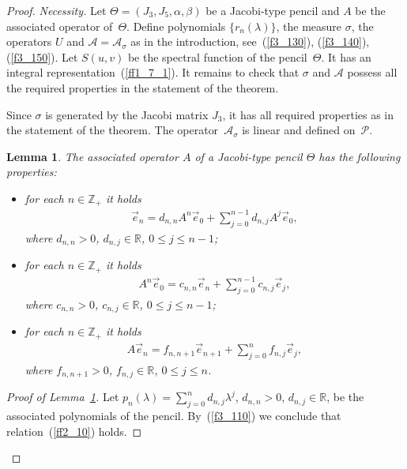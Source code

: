 \documentclass[pdftex]{sigma}
\numberwithin{equation}{section}
\newtheorem{Lemma}[Theorem]{Lemma}
 { \theoremstyle{definition}
\newtheorem{Definition}[Theorem]{Definition}
\newtheorem{Example}[Theorem]{Example} }
\begin{document}
\begin{proof} \textit{Necessity.} Let $\Theta = ( J_3, J_5, \alpha, \beta )$ be a Jacobi-type pencil and $A$ be the associated operator of~$\Theta$. Def\/ine polynomials $\{ r_n(\lambda) \}$, the measure $\sigma$, the operators $U$ and $\mathcal{A}=\mathcal{A}_\sigma$ as in the introduction, see~(\ref{f3_130}), (\ref{f3_140}), (\ref{f3_150}). Let $S(u,v)$ be the spectral function of the pencil~$\Theta$. It has an integral representation~(\ref{ff1_7_1}). It remains to check that $\sigma$ and $\mathcal{A}$ possess all the required properties in the statement of the theorem.

Since $\sigma$ is generated by the Jacobi matrix $J_3$, it has all required properties as in the statement of the theorem. The operator~$\mathcal{A}_\sigma$ is linear and def\/ined on~$\mathcal{P}$.

\begin{Lemma}\label{ll2_1} The associated operator $A$ of a Jacobi-type pencil $\Theta$ has the following properties:
\begin{itemize}\itemsep=0pt
\item[$1)$] for each $n\in\mathbb{Z}_+$ it holds
\begin{gather} \label{ff2_10}
\vec e_n = d_{n,n} A^n \vec e_0 + \sum_{j=0}^{n-1} d_{n,j} A^j \vec e_0,
\end{gather}
where $d_{n,n} > 0$, $d_{n,j}\in\mathbb{R}$, $0\leq j\leq n-1$;

\item[$2)$] for each $n\in\mathbb{Z}_+$ it holds
\begin{gather}\label{ff2_12}
A^n \vec e_0 = c_{n,n} \vec e_n + \sum_{j=0}^{n-1} c_{n,j} \vec e_j,
\end{gather}
where $c_{n,n} > 0$, $c_{n,j}\in\mathbb{R}$, $0\leq j\leq n-1$;

\item[$3)$] for each $n\in\mathbb{Z}_+$ it holds
\begin{gather}\label{ff2_14}
A \vec e_n = f_{n,n+1} \vec e_{n+1} + \sum_{j=0}^{n} f_{n,j} \vec e_j,
\end{gather}
where $f_{n,n+1} > 0$, $f_{n,j}\in\mathbb{R}$, $0\leq j\leq n$.
\end{itemize}
\end{Lemma}

\begin{proof}[Proof of Lemma~\ref{ll2_1}] Let $p_n(\lambda) = \sum\limits_{j=0}^n d_{n,j} \lambda^j$, $d_{n,n}>0$, $d_{n,j}\in\mathbb{R}$, be the associated polyno\-mials of the pencil. By~(\ref{f3_110}) we conclude that relation~(\ref{ff2_10}) holds.


\end{proof}
\end{proof}
\end{document}
